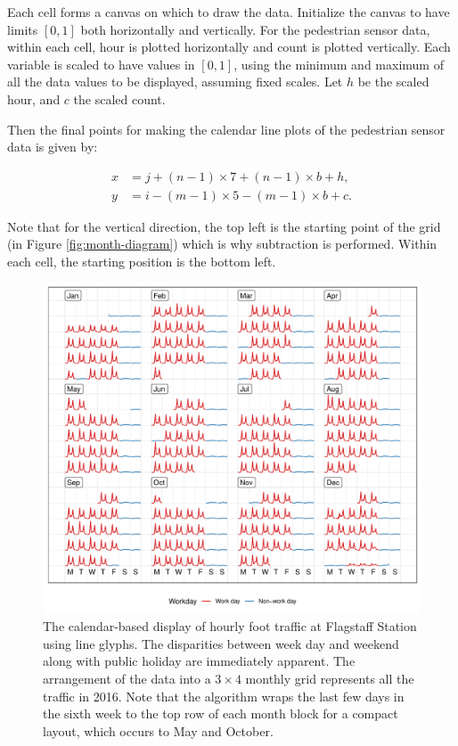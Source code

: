 \documentclass[12pt]{article}
\begin{document}
Each cell forms a canvas on which to draw the data. Initialize the
canvas to have limits \([0, 1]\) both horizontally and vertically. For
the pedestrian sensor data, within each cell, hour is plotted
horizontally and count is plotted vertically. Each variable is scaled to
have values in \([0, 1]\), using the minimum and maximum of all the data
values to be displayed, assuming fixed scales. Let \(h\) be the scaled
hour, and \(c\) the scaled count.

Then the final points for making the calendar line plots of the
pedestrian sensor data is given by:

\begin{equation}
  \begin{aligned}
  x &= j + (n - 1) \times 7 + (n - 1) \times b + h, \\
  y &= i - (m - 1) \times 5 - (m - 1) \times b + c. \label{eq:final}
  \end{aligned}
\end{equation}

Note that for the vertical direction, the top left is the starting point
of the grid (in Figure \ref{fig:month-diagram}) which is why subtraction
is performed. Within each cell, the starting position is the bottom
left.

\begin{figure}

{\centering \includegraphics[width=\textwidth]{figure/fs-2016-1} 

}

\caption{The calendar-based display of hourly foot traffic at Flagstaff Station using line glyphs. The disparities between week day and weekend along with public holiday are immediately apparent. The arrangement of the data into a $3 \times 4$ monthly grid represents all the traffic in 2016. Note that the algorithm wraps the last few days in the sixth week to the top row of each month block for a compact layout, which occurs to May and October.}\label{fig:fs-2016}
\end{figure}
\end{document}
